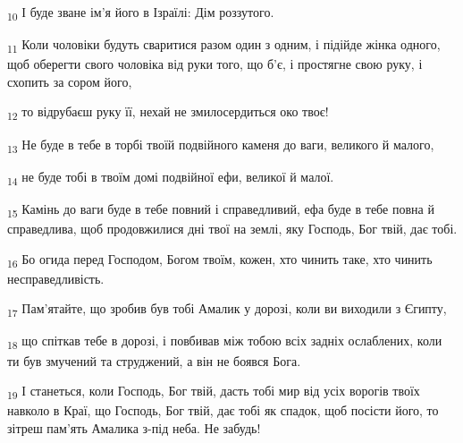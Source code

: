 \begin{tcolorbox}
\textsubscript{10} І буде зване ім'я його в Ізраїлі: Дім роззутого.
\end{tcolorbox}
\begin{tcolorbox}
\textsubscript{11} Коли чоловіки будуть сваритися разом один з одним, і підійде жінка одного, щоб оберегти свого чоловіка від руки того, що б'є, і простягне свою руку, і схопить за сором його,
\end{tcolorbox}
\begin{tcolorbox}
\textsubscript{12} то відрубаєш руку її, нехай не змилосердиться око твоє!
\end{tcolorbox}
\begin{tcolorbox}
\textsubscript{13} Не буде в тебе в торбі твоїй подвійного каменя до ваги, великого й малого,
\end{tcolorbox}
\begin{tcolorbox}
\textsubscript{14} не буде тобі в твоїм домі подвійної ефи, великої й малої.
\end{tcolorbox}
\begin{tcolorbox}
\textsubscript{15} Камінь до ваги буде в тебе повний і справедливий, ефа буде в тебе повна й справедлива, щоб продовжилися дні твої на землі, яку Господь, Бог твій, дає тобі.
\end{tcolorbox}
\begin{tcolorbox}
\textsubscript{16} Бо огида перед Господом, Богом твоїм, кожен, хто чинить таке, хто чинить несправедливість.
\end{tcolorbox}
\begin{tcolorbox}
\textsubscript{17} Пам'ятайте, що зробив був тобі Амалик у дорозі, коли ви виходили з Єгипту,
\end{tcolorbox}
\begin{tcolorbox}
\textsubscript{18} що спіткав тебе в дорозі, і повбивав між тобою всіх задніх ослаблених, коли ти був змучений та струджений, а він не боявся Бога.
\end{tcolorbox}
\begin{tcolorbox}
\textsubscript{19} І станеться, коли Господь, Бог твій, дасть тобі мир від усіх ворогів твоїх навколо в Краї, що Господь, Бог твій, дає тобі як спадок, щоб посісти його, то зітреш пам'ять Амалика з-під неба. Не забудь!
\end{tcolorbox}
